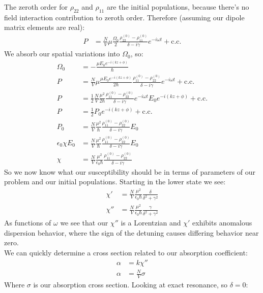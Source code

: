 The zeroth order for $\rho_{22}$ and $\rho_{11}$ are the initial populations, because there's no field interaction contribution to zeroth order. Therefore (assuming our dipole matrix elements are real):
\begin{align*}
	P &= \frac{N}{V}\mu \frac{\Omega_0}{2} \frac{\rho_{22}^{(0)} - \rho_{11}^{(0)}}{\delta - i\gamma} e^{-i\omega t} + \text{c.c.}
\end{align*}
We absorb our spatial variations into $\Omega_0$, so:
\begin{align*}
	\Omega_0 &= -\frac{\mu E_0 e^{-i(kz + \phi)}}{\hbar}\\
	P &= \frac{N}{V}\mu \frac{\mu E_0 e^{-i(kz + \phi)}}{2\hbar} \frac{\rho_{11}^{(0)} - \rho_{22}^{(0)}}{\delta - i\gamma} e^{-i\omega t} + \text{c.c.} \\
	P &= \frac{1}{2}\frac{N}{V}\frac{\mu^2 }{2\hbar} \frac{\rho_{11}^{(0)} - \rho_{22}^{(0)}}{\delta - i\gamma} e^{-i\omega t}E_0 e^{-i(kz + \phi)} + \text{c.c.} \\
	P &= \frac{1}{2}P_0 e^{-i(kz + \phi)} + \text{c.c.} \\
	P_0 &= \frac{N}{V} \frac{\mu^2}{\hbar}\frac{\rho_{11}^{(0)} - \rho_{22}^{(0)}}{\delta - i\gamma}E_0 \\
	\epsilon_0\chi E_0 &= \frac{N}{V} \frac{\mu^2}{\hbar}\frac{\rho_{11}^{(0)} - \rho_{22}^{(0)}}{\delta - i\gamma}E_0 \\
	\chi &= \frac{N}{V} \frac{\mu^2}{\epsilon_0\hbar}\frac{\rho_{11}^{(0)} - \rho_{22}^{(0)}}{\delta - i\gamma}
\end{align*}
So we now know what our susceptibility should be in terms of parameters of our problem and our initial populations. Starting in the lower state we see:
\begin{align*}
	\chi' &= \frac{N}{V} \frac{\mu^2}{\epsilon_0\hbar}\frac{\delta}{\delta^2 + \gamma^2} \\
	\chi'' &= \frac{N}{V} \frac{\mu^2}{\epsilon_0\hbar}\frac{\gamma}{\delta^2 + \gamma^2}
\end{align*}
As functions of $\omega$ we see that our $\chi''$ is a Lorentzian and $\chi'$ exhibits anomalous dispersion behavior, where the sign of the detuning causes differing behavior near zero. \\
We can quickly determine a cross section related to our absorption coefficient:
\begin{align*}
	\alpha &= k\chi'' \\
	\alpha &= \frac{N}{V}\sigma
\end{align*}
Where $\sigma$ is our absorption cross section. Looking at exact resonance, so $\delta = 0$:
